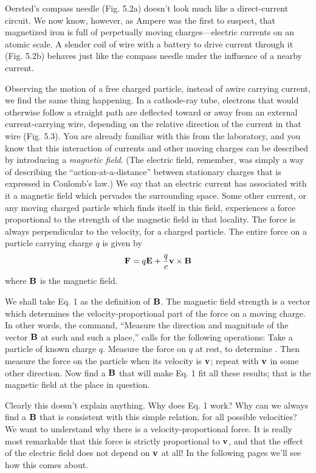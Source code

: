  
Oersted's compass needle (Fig. 5.2a) doesn't look much like a
direct-current circuit. We now know, however, as Ampere was the
first to suspect, that magnetized iron is full of perpetually moving
charges---electric currents on an atomic scale. A slender coil of wire
with a battery to drive current through it (Fig. 5.2b) behaves just
like the compass needle under the inffuence of a nearby current.

Observing the motion of a free charged particle, instead of awire
carrying current, we find the same thing happening. In a cathode-ray
tube, electrons that would otherwise follow a straight path are 
deflected toward or away from an external current-carrying wire, depending
on the relative direction of the current in that wire (Fig. 5.3).
You are already familiar with this from the laboratory, and you know
that this interaction of currents and other moving charges can be
described by introducing a \emph{magnetic field}. (The electric field,
remember, was simply a way of describing the ``action-at-a-distance''
between stationary charges that is expressed in Coulomb's law.)
We say that an electric current has associated with it a magnetic field
which pervades the surrounding space. Some other current, or any
moving charged particle which finds itself in this field, experiences a
force proportional to the strength of the magnetic field in that
locality. The force is always perpendicular to the velocity, for a
charged particle. The entire force on a particle carrying charge $q$ is
given by
\begin{equation}
  \mathbf{F} = q\mathbf{E} + \frac{q}{c}\mathbf{v}\times\mathbf{B}
\end{equation}
where $\mathbf{B}$ is the magnetic field.

We shall take Eq. 1 as the definition of $\mathbf{B}$. The magnetic field
strength is a vector which determines the velocity-proportional part
of the force on a moving charge. In other words, the command,
``Measure the direction and magnitude of the vector $\mathbf{B}$ at such and
such a place,'' calls for the following operations: Take a particle of
known charge $q$. Measure the force on $q$ at rest, to determine .
Then measure the force on the particle when its velocity is $\mathbf{v}$; repeat
with $\mathbf{v}$ in some other direction. Now find a $\mathbf{B}$ that will make Eq. 1
fit all these results; that is the magnetic field at the place in question.

Clearly this doesn't explain anything. Why does Eq. 1 work?
Why can we always find a $\mathbf{B}$ that is consistent with this simple 
relation, for all possible velocities? We want to understand why there
is a velocity-proportional force. It is really most remarkable that
this force is strictly proportional to $\mathbf{v}$, and that the effect of the electric
field does not depend on $\mathbf{v}$ at all! In the following pages we'll see
how this comes about.

